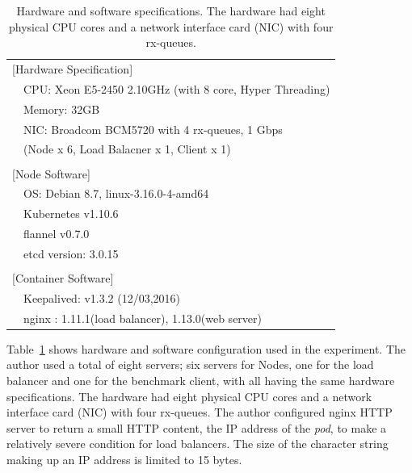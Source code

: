 {
\setlength{\tabcolsep}{2em}
\renewcommand{\arraystretch}{1.1}

\begin{table}[h]
  \centering
  \begin{tabular}{ll}
    \hline 
    \multicolumn{2}{l}{[Hardware Specification]}   \\
    & CPU: Xeon E5-2450 2.10GHz (with 8 core, Hyper Threading) \\
    & Memory: 32GB \\
    & NIC: Broadcom BCM5720 with 4 rx-queues, 1 Gbps \\
    & (Node x 6, Load Balacner x 1, Client x 1) \\
    & \\
    \multicolumn{2}{l}{[Node Software]}  \\
    & OS: Debian 8.7, linux-3.16.0-4-amd64 \\
    & Kubernetes v1.10.6 \\
    & flannel v0.7.0 \\
    & etcd version: 3.0.15 \\
    & \\
    \multicolumn{2}{l}{[Container Software]}   \\
    & Keepalived: v1.3.2 (12/03,2016) \\
    & nginx : 1.11.1(load balancer), 1.13.0(web server) \\
    \hline
  \end{tabular}

  \centering
  \begin{minipage}{0.9\columnwidth}
    \caption[Hardware and software specifications]{
      Hardware and software specifications.
      The hardware had eight physical CPU cores and a network interface card (NIC) with four rx-queues.
    }
    \label{tab:hw_machine_spec}
  \end{minipage}
\end{table}
}

Table~\ref{tab:hw_machine_spec} shows hardware and software configuration used in the experiment.
The author used a total of eight servers; six servers for Nodes, one for the load balancer and one for the benchmark client, with all having the same hardware specifications.
The hardware had eight physical CPU cores and a network interface card (NIC) with four rx-queues.
The author configured nginx HTTP server to return a small HTTP content, the IP address of the {\em pod}, to make a relatively severe condition for load balancers. 
The size of the character string making up an IP address is limited to 15 bytes.

